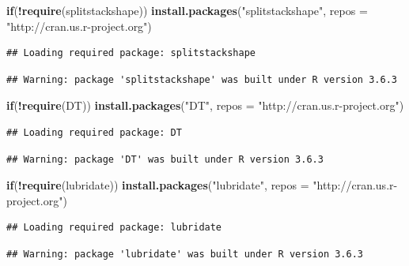 \documentclass[
]{article}
\newenvironment{Shaded}{\begin{snugshade}}{\end{snugshade}}
\newcommand{\ControlFlowTok}[1]{\textcolor[rgb]{0.13,0.29,0.53}{\textbf{#1}}}
\newcommand{\DataTypeTok}[1]{\textcolor[rgb]{0.13,0.29,0.53}{#1}}
\newcommand{\KeywordTok}[1]{\textcolor[rgb]{0.13,0.29,0.53}{\textbf{#1}}}
\newcommand{\NormalTok}[1]{#1}
\newcommand{\OperatorTok}[1]{\textcolor[rgb]{0.81,0.36,0.00}{\textbf{#1}}}
\newcommand{\StringTok}[1]{\textcolor[rgb]{0.31,0.60,0.02}{#1}}
\begin{document}
\begin{Shaded}
\begin{Highlighting}[]
\ControlFlowTok{if}\NormalTok{(}\OperatorTok{!}\KeywordTok{require}\NormalTok{(splitstackshape)) }\KeywordTok{install.packages}\NormalTok{(}\StringTok{"splitstackshape"}\NormalTok{, }\DataTypeTok{repos =} \StringTok{"http://cran.us.r-project.org"}\NormalTok{)}
\end{Highlighting}
\end{Shaded}

\begin{verbatim}
## Loading required package: splitstackshape
\end{verbatim}

\begin{verbatim}
## Warning: package 'splitstackshape' was built under R version 3.6.3
\end{verbatim}

\begin{Shaded}
\begin{Highlighting}[]
\ControlFlowTok{if}\NormalTok{(}\OperatorTok{!}\KeywordTok{require}\NormalTok{(DT)) }\KeywordTok{install.packages}\NormalTok{(}\StringTok{"DT"}\NormalTok{, }\DataTypeTok{repos =} \StringTok{"http://cran.us.r-project.org"}\NormalTok{)}
\end{Highlighting}
\end{Shaded}

\begin{verbatim}
## Loading required package: DT
\end{verbatim}

\begin{verbatim}
## Warning: package 'DT' was built under R version 3.6.3
\end{verbatim}

\begin{Shaded}
\begin{Highlighting}[]
\ControlFlowTok{if}\NormalTok{(}\OperatorTok{!}\KeywordTok{require}\NormalTok{(lubridate)) }\KeywordTok{install.packages}\NormalTok{(}\StringTok{"lubridate"}\NormalTok{, }\DataTypeTok{repos =} \StringTok{"http://cran.us.r-project.org"}\NormalTok{)}
\end{Highlighting}
\end{Shaded}

\begin{verbatim}
## Loading required package: lubridate
\end{verbatim}

\begin{verbatim}
## Warning: package 'lubridate' was built under R version 3.6.3
\end{verbatim}
\end{document}

